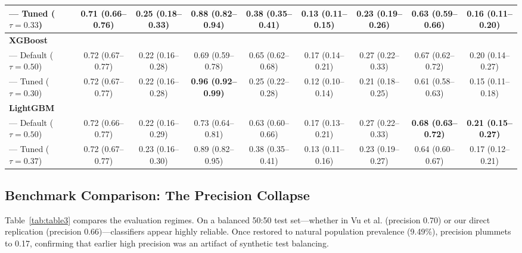\documentclass[conference]{IEEEtran}
\begin{document}
\begin{table}[t]
{\begin{tabular}{lcccccccc}
--- Tuned ($\tau=0.33$) & 0.71 (0.66--0.76) & 0.25 (0.18--0.33) & 0.88 (0.82--0.94) & 0.38 (0.35--0.41) & 0.13 (0.11--0.15) & 0.23 (0.19--0.26) & 0.63 (0.59--0.66) & 0.16 (0.11--0.20) \\
\midrule
\textbf{XGBoost} & & & & & & & & \\
--- Default ($\tau=0.50$) & 0.72 (0.67--0.77) & 0.22 (0.16--0.28) & 0.69 (0.59--0.78) & 0.65 (0.62--0.68) & 0.17 (0.14--0.21) & 0.27 (0.22--0.33) & 0.67 (0.62--0.72) & 0.20 (0.14--0.27) \\
--- Tuned ($\tau=0.30$) & 0.72 (0.67--0.77) & 0.22 (0.16--0.28) & \textbf{0.96 (0.92--0.99)} & 0.25 (0.22--0.28) & 0.12 (0.10--0.14) & 0.21 (0.18--0.25) & 0.61 (0.58--0.63) & 0.15 (0.11--0.18) \\
\midrule
\textbf{LightGBM} & & & & & & & & \\
--- Default ($\tau=0.50$) & 0.72 (0.66--0.77) & 0.22 (0.16--0.29) & 0.73 (0.64--0.81) & 0.63 (0.60--0.66) & 0.17 (0.13--0.21) & 0.27 (0.22--0.33) & \textbf{0.68 (0.63--0.72)} & \textbf{0.21 (0.15--0.27)} \\
--- Tuned ($\tau=0.37$) & 0.72 (0.67--0.77) & 0.23 (0.16--0.30) & 0.89 (0.82--0.95) & 0.38 (0.35--0.41) & 0.13 (0.11--0.16) & 0.23 (0.19--0.27) & 0.64 (0.60--0.67) & 0.17 (0.12--0.21) \\
\bottomrule
\end{tabular}%
}
\end{table}

\subsection{Benchmark Comparison: The Precision Collapse}
Table~\ref{tab:table3} compares the evaluation regimes. On a balanced 50:50 test set---whether in Vu et al. (precision 0.70) or our direct replication (precision 0.66)---classifiers appear highly reliable. Once restored to natural population prevalence (9.49\%), precision plummets to 0.17, confirming that earlier high precision was an artifact of synthetic test balancing.

\begin{table}[t]
\centering
\caption{Comparison of XGBoost Under Original vs. Corrected Protocols}
\label{tab:table3}
\end{table}
\end{document}
